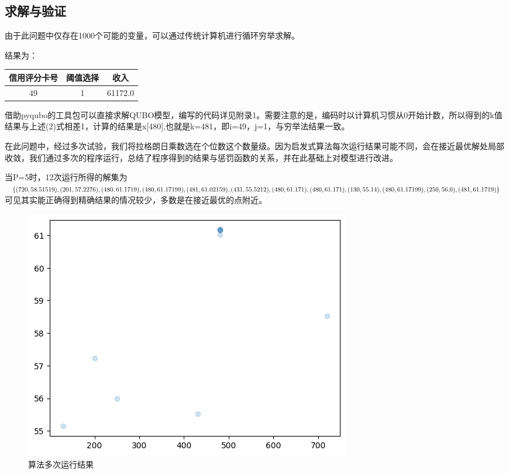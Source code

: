 \documentclass{MathorCupmodeling}
\begin{document}
\subsection{求解与验证}
由于此问题中仅存在1000个可能的变量，可以通过传统计算机进行循环穷举求解。

结果为：
 \begin{center}
 \begin{tabular}{ccc}
   \toprule
   信用评分卡号 & 阈值选择 & 收入  \\
   \midrule
   49 & 1 & 61172.0 \\
    \bottomrule
   \end{tabular}
   \end{center}
   借助pyqubo的工具包可以直接求解QUBO模型，编写的代码详见附录1。需要注意的是，编码时以计算机习惯从0开始计数，所以得到的k值结果与上述(2)式相差1，计算的结果是x[480],也就是k=481，即i=49，j=1，与穷举法结果一致。

   在此问题中，经过多次试验，我们将拉格朗日乘数选在个位数这个数量级。因为启发式算法每次运行结果可能不同，会在接近最优解处局部收敛，我们通过多次的程序运行，总结了程序得到的结果与惩罚函数的关系，并在此基础上对模型进行改进。

   当P=5时，12次运行所得的解集为$\{(720,58.51519),(201,57.2276),(480,61.1719),\\
   (480,61.17199),
   (481,61.02159),(431,55.5212),(480,61.171),(480,61.171),(130,55.14),\\
   (480,61.17199),(250,56.0),(481,61.1719)\}$
   可见其实能正确得到精确结果的情况较少，多数是在接近最优的点附近。
      \begin{figure}[ht]
  \centering
  \includegraphics{figure/output.png}
  \caption{算法多次运行结果}
  \label{fig:my_label}
\end{figure}
\end{document}
